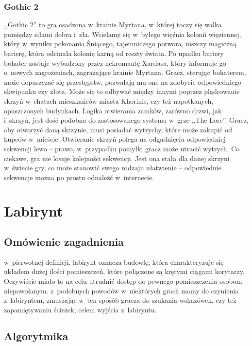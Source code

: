 \documentclass[oneside,polski,logo]{amuthesis}
\begin{document}
\subsubsection{Gothic 2}
\par ,,Gothic 2'' to gra osadzona w~krainie Myrtana, w~której toczy się walka pomiędzy siłami dobra i~zła. Wcielamy się w~byłego więźnia kolonii więziennej, który w~wyniku pokonania Śniącego, tajemniczego potwora, niszczy magiczną barierę, która odcinała kolonię karną od reszty świata. Po upadku bariery bohater zostaje wybudzony przez nekromantę Xardasa, który informuje go o~nowych zagrożeniach, zagrażające krainie Myrtana. Gracz, sterując bohaterem, może dopuszczać się przestępstw, pozwalają mu one na zdobycie odpowiedniego ekwipunku czy złota. Może się to odbywać między innymi poprzez plądrowanie skrzyń w~chatach mieszkańców miasta Khorinis, czy też napotkanych, opuszczonych budynkach. 
Logika otwierania zamków, zarówno drzwi, jak i~skrzyń, jest dość podobna do zastosowanego systemu w~grze ,,The Lore''. Gracz, aby otworzyć daną skrzynie, musi posiadać wytrychy, które może zakupić od kupców w~mieście. Otwieranie skrzyń polega na odgadnięciu odpowiedniej sekwencji lewo – prawo, w~przypadku pomyłki gracz może utracić wytrych. Co ciekawe, gra nie losuje kolejności sekwencji. Jest ona stała dla danej skrzyni w~świecie gry, co może stanowić swego rodzaju ułatwienie – odpowiednie sekwencje można po prostu odnaleźć w~internecie.


\section{Labirynt}
\subsection{Omówienie zagadnienia}
\par w~pierwotnej definicji, labirynt oznacza budowlę, która charakteryzuje się układem dużej ilości pomieszczeń, które połączone są krętymi ciągami korytarzy. Oczywiście miało to na celu utrudnić dostęp do pewnego pomieszczenia osobom niepowołanym. z~podobnych powodów w~niektórych grach mamy do czynienia z~labiryntem, zmuszając w~ten sposób gracza do szukania wskazówek, czy też zapamiętywaniu ścieżek, celem wyjścia z~labiryntu. 
\subsection{Algorytmika}
\end{document}
